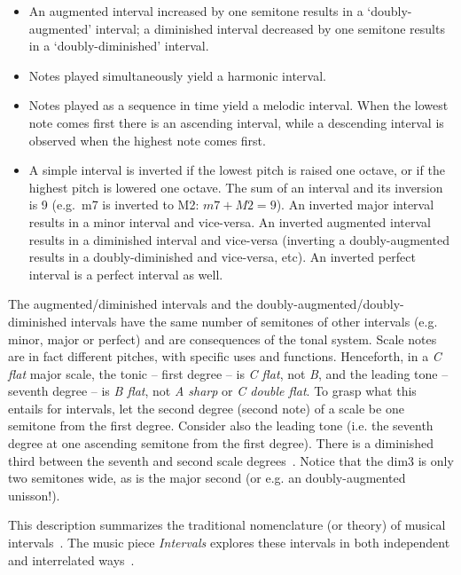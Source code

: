 \documentclass[format=acmsmall, review=false, screen=true]{acmart}
\begin{document}
\begin{itemize}
	\item An augmented interval increased by one semitone results in a `doubly-augmented' interval; a diminished interval decreased by one semitone results in a `doubly-diminished' interval.
	\item Notes played simultaneously yield a harmonic interval.
	\item Notes played as a sequence in time yield a
                melodic interval.  When the lowest note comes first there is an ascending interval, while a descending interval is observed when the highest note comes first. 
	\item A simple interval is inverted if the lowest pitch is raised one octave, or if
                the highest pitch is lowered one octave. The sum of an interval and its inversion is
                9 (e.g.\ m7 is inverted to M2: $m7+M2=9$). An inverted major
                interval results in a minor interval and vice-versa. An
                inverted augmented interval results in a diminished interval
                and vice-versa (inverting a doubly-augmented results in a
                doubly-diminished and vice-versa, etc).
                An inverted perfect interval is a perfect interval as well.
\end{itemize}

The augmented/diminished intervals and the doubly-augmented/doubly-diminished intervals have the same number of semitones of other intervals (e.g. minor, major or perfect) and are consequences of the tonal system.
Scale notes are in fact different pitches, with specific uses and functions. Henceforth, in a \textit{C flat} major scale, the tonic -- first degree -- is \textit{C flat}, not \textit{B}, and the leading tone -- seventh degree -- is \textit{B flat}, not \textit{A sharp} or \textit{C double flat}.
To grasp what this entails for intervals, let the second degree (second note) of a scale be one semitone from the first degree. Consider also the leading tone (i.e. the seventh degree at one ascending semitone from the first degree). There is a diminished third between the seventh and second scale degrees~\cite{Lacerda}.
Notice that the dim3 is only two semitones wide, as is the major second (or e.g. an doubly-augmented unisson!).

This description summarizes the traditional nomenclature (or theory) of musical intervals~\cite{Lacerda}.
The music piece \emph{Intervals} explores these intervals in both independent and interrelated ways~\cite{MASSA}.
\end{document}
